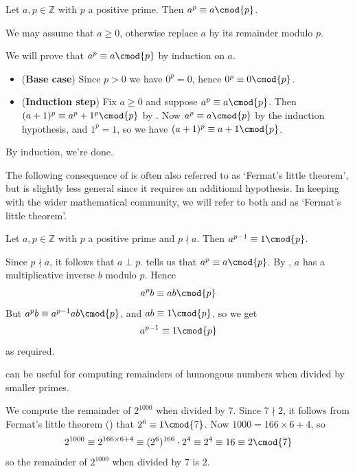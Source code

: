 \begin{theorem} \label{thmFermatLittle} 
Let $a,p \in \mathbb{Z}$ with $p$ a positive prime. Then $a^p \equiv a \cmod{p}$.
\end{theorem}
\begin{cproof}
We may assume that $a \ge 0$, otherwise replace $a$ by its remainder modulo $p$.

We will prove that $a^{p} \equiv a \cmod{p}$ by induction on $a$.
\begin{itemize}
\item (\textbf{Base case}) Since $p > 0$ we have $0^p=0$, hence $0^p \equiv 0 \cmod{p}$.
\item (\textbf{Induction step}) Fix $a \ge 0$ and suppose $a^p \equiv a \cmod{p}$. Then $(a+1)^p \equiv a^p+1^p \cmod{p}$ by . Now $a^p \equiv a \cmod{p}$ by the induction hypothesis, and $1^p = 1$, so we have $(a+1)^p \equiv a+1 \cmod{p}$.
\end{itemize}
By induction, we're done.
\end{cproof}

The following consequence of  is often also referred to as `Fermat's little theorem', but is slightly less general since it requires an additional hypothesis. In keeping with the wider mathematical community, we will refer to both  and  as `Fermat's little theorem'.

\begin{corollary}
\label{corFermatLittleAlt}
Let $a,p \in \mathbb{Z}$ with $p$ a positive prime and $p \nmid a$. Then $a^{p-1} \equiv 1 \cmod{p}$.
\end{corollary}
\begin{cproof}
Since $p \nmid a$, it follows that $a \perp p$.  tells us that $a^p \equiv a \cmod{p}$. By , $a$ has a multiplicative inverse $b$ modulo $p$. Hence
\[ a^{p}b \equiv ab \cmod{p} \]
But $a^{p}b \equiv a^{p-1}ab \cmod{p}$, and $ab \equiv 1 \cmod{p}$, so we get
\[ a^{p-1} \equiv 1 \cmod{p} \]
as required.
\end{cproof}

 can be useful for computing remainders of humongous numbers when divided by smaller primes.

\begin{example}
We compute the remainder of $2^{1000}$ when divided by $7$. Since $7 \nmid 2$, it follows from Fermat's little theorem () that $2^6 \equiv 1 \cmod{7}$. Now $1000 = 166 \times 6 + 4$, so
\[ 2^{1000} \equiv 2^{166 \times 6 + 4} \equiv (2^6)^{166} \cdot 2^4 \equiv 2^4 \equiv 16 \equiv 2 \cmod{7} \]
so the remainder of $2^{1000}$ when divided by $7$ is $2$.
\end{example}

